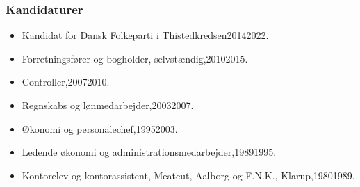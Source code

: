 \documentclass[11pt, a4paper]{awesome-cv}
\begin{document}
\begin{cvletter}
\subsubsection*{Kandidaturer}
\begin{itemize}
\item Kandidat for Dansk Folkeparti i Thistedkredsen20142022.
\end{itemize}
\begin{itemize}
\item Forretningsfører og bogholder, selvstændig,20102015.
\item Controller,20072010.
\item Regnskabs og lønmedarbejder,20032007.
\item Økonomi og personalechef,19952003.
\item Ledende økonomi og administrationsmedarbejder,19891995.
\item Kontorelev og kontorassistent, Meatcut, Aalborg og F.N.K., Klarup,19801989.
\end{itemize}
\end{cvletter}
\end{document}
